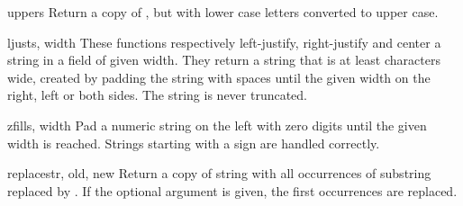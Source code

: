 \begin{funcdesc}{upper}{s}
  Return a copy of , but with lower case letters converted to
  upper case.
\end{funcdesc}

\begin{funcdesc}{ljust}{s, width}
  These functions respectively left-justify, right-justify and center
  a string in a field of given width.  They return a string that is at
  least  characters wide, created by padding the string
   with spaces until the given width on the right, left or both
  sides.  The string is never truncated.
\end{funcdesc}

\begin{funcdesc}{zfill}{s, width}
  Pad a numeric string on the left with zero digits until the given
  width is reached.  Strings starting with a sign are handled
  correctly.
\end{funcdesc}

\begin{funcdesc}{replace}{str, old, new}
  Return a copy of string  with all occurrences of substring
   replaced by .  If the optional argument
   is given, the first  occurrences are
  replaced.
\end{funcdesc}
